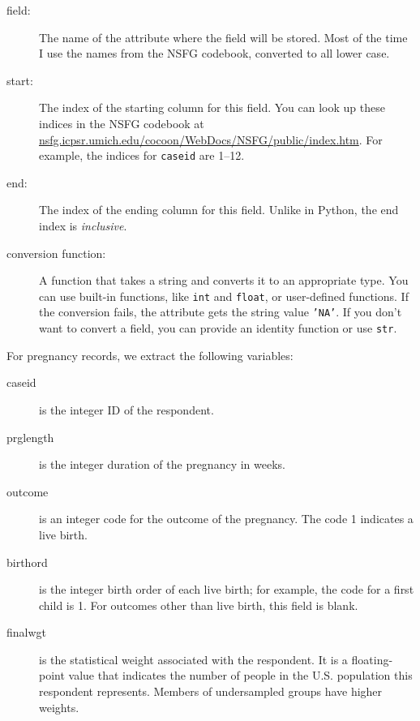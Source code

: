 \documentclass[12pt]{book}
\begin{document}
\begin{description}

\item[field:] The name of the attribute where the field
will be stored.  Most of the time I use the names from the
NSFG codebook, converted to all lower case.

\item[start:] The index of the starting column for this
field.  You can look up these indices in the NSFG codebook
at \url{nsfg.icpsr.umich.edu/cocoon/WebDocs/NSFG/public/index.htm}.
For example, the indices for {\tt caseid} are
1--12.

\item[end:] The index of the ending column for this
field.  Unlike in Python, the end index is {\em inclusive}.

\item[conversion function:] A function that takes a string
and converts it to an appropriate type.  You can use built-in
functions, like {\tt int} and {\tt float}, or user-defined
functions.  If the conversion fails, the attribute gets the
string value {\tt 'NA'}.  If you don't want to convert a
field, you can provide an identity function or use {\tt str}.

\end{description}

For pregnancy records, we extract the following variables:

\begin{description}

\item[caseid] is the integer ID of the respondent.

\item[prglength] is the integer duration of the pregnancy in weeks.

\item[outcome] is an integer code for the outcome of the pregnancy.
The code 1 indicates a live birth.

\item[birthord] is the integer birth order of each live birth;
for example, the code for a first child is 1. 
For outcomes other than live birth, this field is blank.

\item[finalwgt] is the statistical weight associated with the respondent.
It is a floating-point value that indicates the number of people in
the U.S. population this respondent represents.  Members of undersampled
groups have higher weights.

\end{description}
\end{document}
